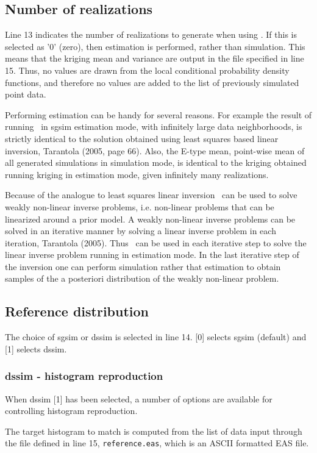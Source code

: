 \documentclass[12t]{article}
\begin{document}
\subsection{Number of realizations}
Line 13 indicates the number of realizations to generate when using \visimprog. If this is selected as '0' (zero), then estimation is performed, rather than simulation. This means that the kriging mean and variance are output in the file specified in line 15. Thus, no values are drawn from the local conditional probability density functions, and therefore no values are added to the list of previously simulated point data.

Performing estimation can be handy for several reasons. For example
the result of running
\visimprog~in sgsim estimation mode, with infinitely large data
neighborhoods, is strictly identical to the 
solution obtained using least squares based linear inversion, Tarantola (2005, page 66).
Also, the E-type mean, point-wise mean of all generated simulations in
simulation mode,
is identical to the kriging obtained running kriging in estimation
mode, given infinitely many realizations. 

Because of the analogue to least squares linear inversion
\visimprog~can be used to solve weakly non-linear inverse problems,
i.e. non-linear problems that can be linearized around a prior model.
A weakly non-linear inverse problems can be solved in an iterative
manner by solving a linear inverse problem in each iteration, Tarantola (2005).
Thus \visimprog~can be used in each iterative step to solve the linear
inverse problem running in estimation mode.
In the last iterative step of the inversion one can perform simulation
rather that estimation to obtain samples of the a posteriori
distribution of the weakly non-linear problem.

\subsection{Reference distribution}
The choice of sgsim or dssim is selected in line 14.
[0] selects sgsim (default) and [1] selects dssim.


\subsubsection{dssim - histogram reproduction}
When dssim [1] has been selected, a number of options are available for controlling histogram reproduction.

The target histogram to match is computed from the list of data input through the file defined in line 15, \texttt{reference.eas}, which is an ASCII formatted EAS file.
\end{document}
